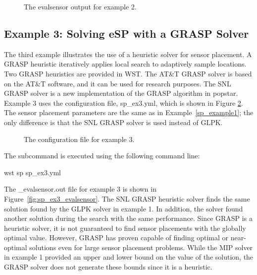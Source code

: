 \begin{figure}[h]
  \caption{The evalsensor output for  example 2.}
  \label{fig:sp_ex2_evalsensor}
\end{figure}

\FloatBarrier 
\subsection{Example 3: Solving eSP with a GRASP Solver}
\label{sp_example3}

The third example illustrates the use of a heuristic solver for sensor placement. 
A GRASP heuristic iteratively applies local search to adaptively sample locations. 
Two GRASP heuristics are provided in WST. The AT\&T GRASP solver is based on the
AT\&T  software, and it can be used for research
purposes. The SNL GRASP solver is a new implementation of
the GRASP algorithm in popstar. Example 3 uses the configuration file, sp\_ex3.yml, which is 
shown in Figure \ref{fig:sp_ex3}. The sensor placement parameters are the same as 
in Example~\ref{sp_example1}; the only difference is that the SNL GRASP solver is used instead of GLPK.

\begin{figure}[h]
  \caption{The  configuration file for example 3.}
  \label{fig:sp_ex3}
\end{figure}

The  subcommand is executed using the following command line:

\begin{unknownListing}
wst sp sp_ex3.yml
\end{unknownListing}

The {\outputprefix}\_evalsensor.out file for example 3 is shown in Figure~\ref{fig:sp_ex3_evalsensor}. 
The SNL GRASP heuristic solver finds the same solution found by 
the GLPK solver in example 1. In addition, the solver found 
another solution during the search with the same performance. Since GRASP is a heuristic solver, 
it is not guaranteed to find sensor placements with the globally optimal value. 
However, GRASP has proven capable of finding optimal or near-optimal solutions
even for large sensor placement problems. While the MIP solver in example 1
provided an upper and lower bound on the value of the solution, the GRASP solver
does not generate these bounds since it is a heuristic. 

